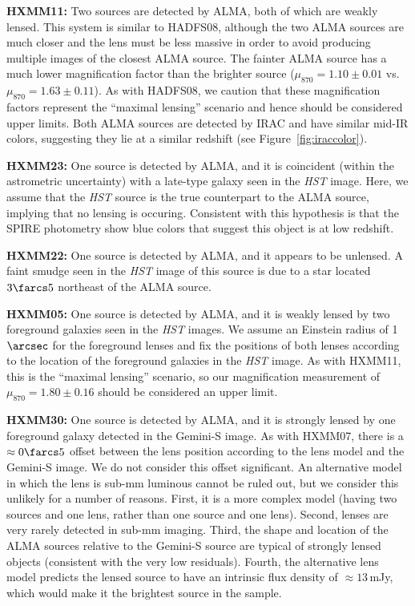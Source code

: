 \documentclass[iop]{emulateapj}
\begin{document}
{\bf HXMM11:} Two sources are detected by ALMA, both of which are weakly lensed.
This system is similar to HADFS08, although the two ALMA sources are much closer
and the lens must be less massive in order to avoid producing multiple images
of the closest ALMA source.  The fainter ALMA source has a much lower
magnification factor than the brighter source ($\mu_{870} = 1.10 \pm 0.01$ vs.
$\mu_{870} = 1.63 \pm 0.11$).  As with HADFS08, we caution that these
magnification factors represent the ``maximal lensing'' scenario and hence
should be considered upper limits.  Both ALMA sources are detected by IRAC and
have similar mid-IR colors, suggesting they lie at a similar redshift (see
Figure~\ref{fig:iraccolor}).

{\bf HXMM23:} One source is detected by ALMA, and it is coincident (within the
astrometric uncertainty) with a late-type galaxy seen in the {\it HST} image.
Here, we assume that the {\it HST} source is the true counterpart to the ALMA
source, implying that no lensing is occuring.  Consistent with this hypothesis
is that the SPIRE photometry show blue colors that suggest this object is at low
redshift.

{\bf HXMM22:} One source is detected by ALMA, and it appears to be unlensed.  A
faint smudge seen in the {\it HST} image of this source is due to a star
located $3\farcs5$ northeast of the ALMA source.

{\bf HXMM05:} One source is detected by ALMA, and it is weakly lensed by two
foreground galaxies seen in the {\it HST} images.  We assume an Einstein radius
of 1$\arcsec$ for the foreground lenses and fix the positions of both lenses
according to the location of the foreground galaxies in the {\it HST} image.
As with HXMM11, this is the ``maximal lensing'' scenario, so our magnification
measurement of $\mu_{870} = 1.80 \pm 0.16$ should be considered an upper limit.

{\bf HXMM30:} One source is detected by ALMA, and it is strongly lensed by one
foreground galaxy detected in the Gemini-S image.  As with HXMM07, there is a
$\approx 0\farcs5$ offset between the lens position according to the lens model
and the Gemini-S image.  We do not consider this offset significant.  An
alternative model in which the lens is sub-mm luminous cannot be ruled out, but
we consider this unlikely for a number of reasons.  First, it is a more complex
model (having two sources and one lens, rather than one source and one lens).
Second, lenses are very rarely detected in sub-mm imaging.  Third, the shape
and location of the ALMA sources relative to the Gemini-S source are typical of
strongly lensed objects (consistent with the very low residuals).  Fourth, the
alternative lens model predicts the lensed source to have an intrinsic flux
density of $\approx 13 \,$mJy, which would make it the brightest source in the
sample.
\end{document}
